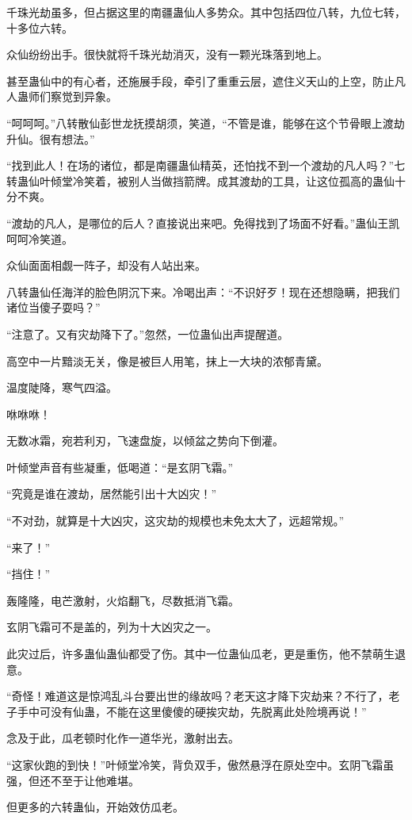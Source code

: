 \begin{this_body}
千珠光劫虽多，但占据这里的南疆蛊仙人多势众。其中包括四位八转，九位七转，十多位六转。

众仙纷纷出手。很快就将千珠光劫消灭，没有一颗光珠落到地上。

甚至蛊仙中的有心者，还施展手段，牵引了重重云层，遮住义天山的上空，防止凡人蛊师们察觉到异象。

“呵呵呵。”八转散仙彭世龙抚摸胡须，笑道，“不管是谁，能够在这个节骨眼上渡劫升仙。很有想法。”

“找到此人！在场的诸位，都是南疆蛊仙精英，还怕找不到一个渡劫的凡人吗？”七转蛊仙叶倾堂冷笑着，被别人当做挡箭牌。成其渡劫的工具，让这位孤高的蛊仙十分不爽。

“渡劫的凡人，是哪位的后人？直接说出来吧。免得找到了场面不好看。”蛊仙王凯呵呵冷笑道。

众仙面面相觑一阵子，却没有人站出来。

八转蛊仙任海洋的脸色阴沉下来。冷喝出声：“不识好歹！现在还想隐瞒，把我们诸位当傻子耍吗？”

“注意了。又有灾劫降下了。”忽然，一位蛊仙出声提醒道。

高空中一片黯淡无关，像是被巨人用笔，抹上一大块的浓郁青黛。

温度陡降，寒气四溢。

咻咻咻！

无数冰霜，宛若利刃，飞速盘旋，以倾盆之势向下倒灌。

叶倾堂声音有些凝重，低喝道：“是玄阴飞霜。”

“究竟是谁在渡劫，居然能引出十大凶灾！”

“不对劲，就算是十大凶灾，这灾劫的规模也未免太大了，远超常规。”

“来了！”

“挡住！”

轰隆隆，电芒激射，火焰翻飞，尽数抵消飞霜。

玄阴飞霜可不是盖的，列为十大凶灾之一。

此灾过后，许多蛊仙蛊仙都受了伤。其中一位蛊仙瓜老，更是重伤，他不禁萌生退意。

“奇怪！难道这是惊鸿乱斗台要出世的缘故吗？老天这才降下灾劫来？不行了，老子手中可没有仙蛊，不能在这里傻傻的硬挨灾劫，先脱离此处险境再说！”

念及于此，瓜老顿时化作一道华光，激射出去。

“这家伙跑的到快！”叶倾堂冷笑，背负双手，傲然悬浮在原处空中。玄阴飞霜虽强，但还不至于让他难堪。

但更多的六转蛊仙，开始效仿瓜老。


\end{this_body}

